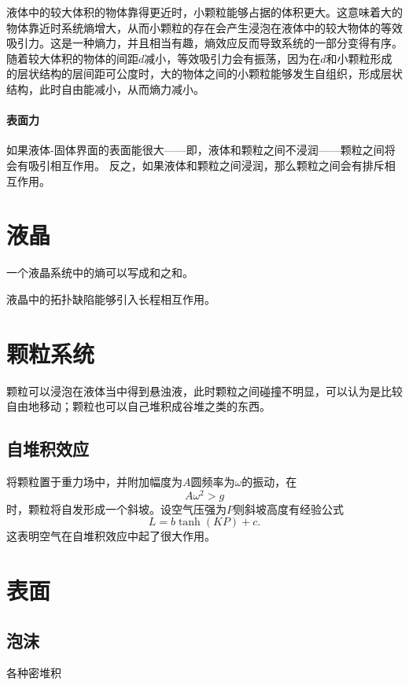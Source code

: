 液体中的较大体积的物体靠得更近时，小颗粒能够占据的体积更大。这意味着大的物体靠近时系统熵增大，从而小颗粒的存在会产生浸泡在液体中的较大物体的等效吸引力。这是一种熵力，并且相当有趣，熵效应反而导致系统的一部分变得有序。
随着较大体积的物体的间距$d$减小，等效吸引力会有振荡，因为在$d$和小颗粒形成的层状结构的层间距可公度时，大的物体之间的小颗粒能够发生自组织，形成层状结构，此时自由能减小，从而熵力减小。

\subsubsection{表面力}

如果液体-固体界面的表面能很大——即，液体和颗粒之间不浸润——颗粒之间将会有吸引相互作用。
反之，如果液体和颗粒之间浸润，那么颗粒之间会有排斥相互作用。

\chapter{液晶}

一个液晶系统中的熵可以写成和之和。

液晶中的拓扑缺陷能够引入长程相互作用。

\chapter{颗粒系统}

颗粒可以浸泡在液体当中得到悬浊液，此时颗粒之间碰撞不明显，可以认为是比较自由地移动；颗粒也可以自己堆积成谷堆之类的东西。

\section{自堆积效应}

将颗粒置于重力场中，并附加幅度为$A$圆频率为$\omega$的振动，在
\begin{equation}
    A \omega^2 > g
\end{equation}
时，颗粒将自发形成一个斜坡。设空气压强为$P$则斜坡高度有经验公式
\begin{equation}
    L = b \tanh(KP) + c.
\end{equation}
这表明空气在自堆积效应中起了很大作用。

\chapter{表面}

\section{泡沫}

各种密堆积